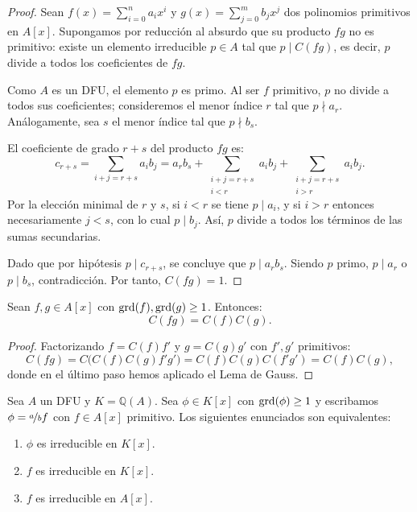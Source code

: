 \begin{proof}
    Sean $f(x) = \sum\limits_{i=0}^n a_i x^i$ y $g(x) = \sum\limits_{j=0}^m b_j x^j$ dos polinomios primitivos en $A[x]$. Supongamos por reducción al absurdo que su producto $fg$ no es primitivo: existe un elemento irreducible $p \in A$ tal que $p \mid C(fg)$, es decir, $p$ divide a todos los coeficientes de $fg$.

    Como $A$ es un DFU, el elemento $p$ es primo. Al ser $f$ primitivo, $p$ no divide a todos sus coeficientes; consideremos el menor índice $r$ tal que $p \nmid a_r$. Análogamente, sea $s$ el menor índice tal que $p \nmid b_s$.

    El coeficiente de grado $r + s$ del producto $fg$ es:
    \[
        c_{r+s} = \sum\limits_{i+j = r+s} a_i b_j = a_r b_s + \sum\limits_{\substack{i+j = r+s \\ i < r}} a_i b_j + \sum\limits_{\substack{i+j = r+s \\ i > r}} a_i b_j.
    \]
    Por la elección minimal de $r$ y $s$, si $i < r$ se tiene $p \mid a_i$, y si $i > r$ entonces necesariamente $j < s$, con lo cual $p \mid b_j$. Así, $p$ divide a todos los términos de las sumas secundarias.

    Dado que por hipótesis $p \mid c_{r+s}$, se concluye que $p \mid a_r b_s$. Siendo $p$ primo, $p \mid a_r$ o $p \mid b_s$, contradicción. Por tanto, $C(fg) = 1$.
\end{proof}

\begin{coro}
    Sean $f, g \in A[x]$ con $\operatorname{grd}(f), \operatorname{grd}(g) \geq 1$. Entonces:
    \[
        C(fg) = C(f) C(g).
    \]
\end{coro}

\begin{proof}
    Factorizando $f = C(f)f'$ y $g = C(g)g'$ con $f', g'$ primitivos:
    \[
        C(fg) = C\bigl(C(f)C(g) f'g'\bigr) = C(f)C(g) C(f'g') = C(f)C(g),
    \]
    donde en el último paso hemos aplicado el Lema de Gauss.
\end{proof}

\begin{teo}\label{teoEqIrreducibles}
    Sea $A$ un DFU y $K = \mathbb{Q}(A)$. Sea $\phi \in K[x]$ con $\operatorname{grd}(\phi) \geq 1$ y escribamos $\phi = \nicefrac{a}{b} f$ con $f \in A[x]$ primitivo. Los siguientes enunciados son equivalentes:
    \begin{enumerate}[label=\arabic*)]
        \item $\phi$ es irreducible en $K[x]$.
        \item $f$ es irreducible en $K[x]$.
        \item $f$ es irreducible en $A[x]$.
    \end{enumerate}
\end{teo}

